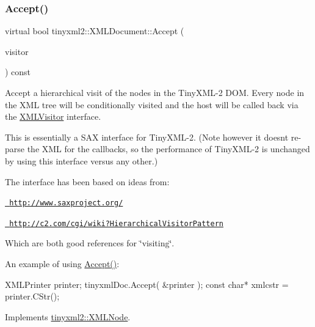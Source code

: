 \subsubsection{\texorpdfstring{Accept()}{Accept()}}
{\footnotesize\ttfamily virtual bool tinyxml2\+::\+X\+M\+L\+Document\+::\+Accept (\begin{DoxyParamCaption}\item[{\mbox{\hyperlink{classtinyxml2_1_1XMLVisitor}{X\+M\+L\+Visitor}} $\ast$}]{visitor }\end{DoxyParamCaption}) const\hspace{0.3cm}{\ttfamily [virtual]}}

Accept a hierarchical visit of the nodes in the Tiny\+X\+M\+L-\/2 D\+OM. Every node in the X\+ML tree will be conditionally visited and the host will be called back via the \mbox{\hyperlink{classtinyxml2_1_1XMLVisitor}{X\+M\+L\+Visitor}} interface.

This is essentially a S\+AX interface for Tiny\+X\+M\+L-\/2. (Note however it doesn\textquotesingle{}t re-\/parse the X\+ML for the callbacks, so the performance of Tiny\+X\+M\+L-\/2 is unchanged by using this interface versus any other.)

The interface has been based on ideas from\+:


\begin{DoxyItemize}
\item \href{http://www.saxproject.org/}{\texttt{ http\+://www.\+saxproject.\+org/}}
\item \href{http://c2.com/cgi/wiki?HierarchicalVisitorPattern}{\texttt{ http\+://c2.\+com/cgi/wiki?\+Hierarchical\+Visitor\+Pattern}}
\end{DoxyItemize}

Which are both good references for \char`\"{}visiting\char`\"{}.

An example of using \mbox{\hyperlink{classtinyxml2_1_1XMLDocument_a9efa54f7ecb37c17ab1fa2b3078ccca1}{Accept()}}\+: \begin{DoxyVerb}XMLPrinter printer;
tinyxmlDoc.Accept( &printer );
const char* xmlcstr = printer.CStr();
\end{DoxyVerb}
 

Implements \mbox{\hyperlink{classtinyxml2_1_1XMLNode_a81e66df0a44c67a7af17f3b77a152785}{tinyxml2\+::\+X\+M\+L\+Node}}.

\mbox{\label{classtinyxml2_1_1XMLDocument_af592ffc91514e25a39664521ac83db45}} 
